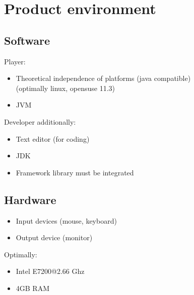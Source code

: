 \section{Product environment}

\subsection{Software}
Player:
\begin{itemize}
\item Theoretical independence of platforms (\Gls{java} compatible) \\ 
	(optimally \gls{linux}, \gls{opensuse} 11.3)
\item \Gls{JVM}
\end{itemize}
Developer additionally:
\begin{itemize}
\item Text editor (for coding)
\item \Gls{JDK}
\item Framework library must be integrated
\end{itemize}

\subsection{Hardware}
\begin{itemize}
\item Input devices (mouse, keyboard)
\item Output device (monitor)
\end{itemize}
Optimally:
\begin{itemize}
\item Intel E7200@2.66 Ghz
\item 4GB RAM
\end{itemize}